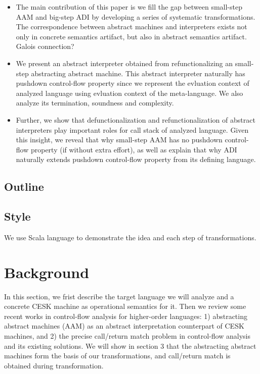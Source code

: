 \documentclass[acmsmall,review,anonymous]{acmart}\settopmatter{printfolios=true,printccs=false,printacmref=false}
\begin{document}
\begin{itemize}
\item The main contribution of this paper is we fill the gap
  between small-step AAM and big-step ADI by developing a series of
  systematic transformations. The correspondence between abstract
  machines and interpreters exists not only in concrete semantics artifact,
  but also in abstract semantics artifact.
  Galois connection?

\item We present an abstract interpreter obtained from refunctionalizing
  an small-step abstracting abstract machine. 
  This abstract interpreter naturally has pushdown control-flow property
  since we represent the evluation context of analyzed language using
  evluation context of the meta-language.
  We also analyze its termination, soundness and complexity.

\item Further, we show that defunctionalization and refunctionalization
  of abstract interpreters play important roles for call stack of analyzed language.
  Given this insight, we reveal that why small-step AAM has no pushdown
  control-flow property (if without extra effort), as well as explain
  that why ADI naturally extends pushdown control-flow property from its
  defining language.

\end{itemize}

\subsection{Outline}

\subsection{Style}

We use Scala language to demonstrate the idea and each step of transformations.

\section{Background}

In this section, we frist describe the target language we will
analyze and a concrete CESK machine as operational semantics for it.
Then we review some recent works in control-flow analysis for
higher-order languages:
1) abstracting abstract machines (AAM) as an abstract interpretation
counterpart of CESK machines, and
2) the precise call/return match problem in control-flow analysis and its existing solutions.
We will show in section 3 that the abstracting abstract machines form the basis of our transformations,
and call/return match is obtained during transformation.
\end{document}
